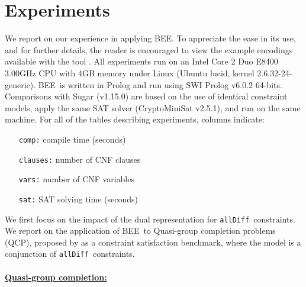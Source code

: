 \documentclass{tlp}
\newcommand{\allDifferent}{\texttt{allDiff}}
\newcommand{\bee}{\textsf{BEE}}
\begin{document}
\section{Experiments}\label{results}


We report on our experience in applying \bee. To appreciate the ease
in its use, and for further details, the reader is encouraged to view
the example encodings available with the tool \cite{bee2012}.
All experiments run on an Intel Core 2 Duo E8400 3.00GHz CPU with 4GB
memory under Linux (Ubuntu lucid, kernel 2.6.32-24-generic).
\bee\ is written in Prolog and run using SWI Prolog v6.0.2 64-bits.
Comparisons with Sugar (v1.15.0) are based on the use of identical
constraint models, apply the same SAT solver (CryptoMiniSat v2.5.1),
and run on the same machine.
For all of the tables describing
experiments, columns indicate:

\vspace{-3mm}
\qquad\begin{minipage}{0.45\linewidth}
\qquad\begin{itemize}
\item[\texttt{comp:}]     compile time (seconds) 
\item[\texttt{clauses:}]  number of CNF clauses
\end{itemize}
\end{minipage}
\begin{minipage}{0.4\linewidth}
\qquad\begin{itemize}
\item[\texttt{vars:}]     number of CNF variables
\item[\texttt{sat:}]      SAT solving time (seconds)
\end{itemize}
\end{minipage}
\medskip


We first focus on the impact of the dual representation for
\allDifferent\ constraints. We report on the application of \bee\ to
Quasi-group completion problems (QCP), proposed by
 as a constraint satisfaction benchmark,
where the model is a conjunction of \allDifferent\ constraints.


\vspace{-3mm}
\paragraph{\underline{Quasi-group completion:}}
\end{document}

